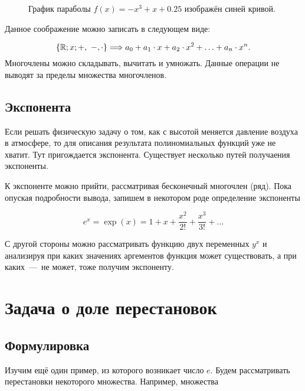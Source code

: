 \documentclass[12pt]{article}
\begin{document}
\begin{figure}[htbp]
\centering
{}
\caption{График параболы $f(x) = -x^3 + x + 0.25$ изображён синей кривой.}
\label{fig:71}
\end{figure}
Данное соображение можно записать в следующем виде:

\begin{equation}
	\qty{\mathbb{R}; x; +,\ -, \cdot} \Longrightarrow a_0 + a_1 \cdot x + a_2 \cdot x^2 + \ldots + a_n \cdot x^n.
\end{equation}
Многочлены можно складывать, вычитать и умножать. Данные операции не выводят за пределы множества многочленов. 

\subsection{Экспонента}
Если решать физическую задачу о том, как с высотой меняется давление воздуха в атмосфере, то для описания результата полиномиальных функций уже не хватит. Тут пригождается экспонента. Существует несколько путей получаения экспоненты.

\par К экспоненте можно прийти, рассматривая бесконечный многочлен (ряд). Пока опуская подробности вывода, запишем в некотором роде определение экспоненты

\begin{equation}
	e^x = \exp(x) = 1 + x + \dfrac{x^2}{2!} + \dfrac{x^3}{3!} + \ldots
\end{equation}

\par С другой стороны можно рассматривать функцию двух переменных $y^x$ и анализируя при каких значениях аргементов функция может существовать, а при каких~\----~не может, тоже получим экспоненту.

\section{Задача о доле перестановок} %
\subsection{Формулировка} %
Изучим ещё один пример, из которого возникает число $e$. Будем рассматривать перестановки некоторого множества. Например, множества 
\end{document}
